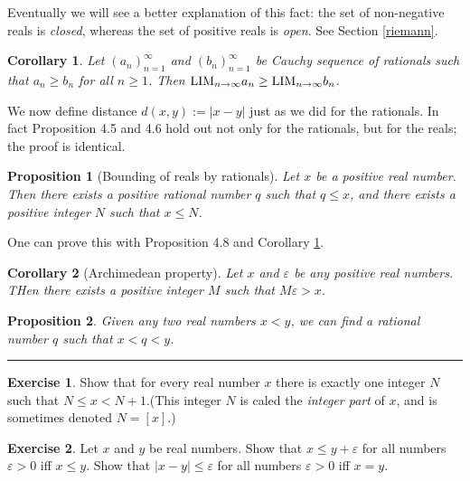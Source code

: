 \documentclass[
]{book}
\newtheorem{corollary}{Corollary}[chapter]
\newtheorem{proposition}{Proposition}[chapter]
\theoremstyle{definition}
\theoremstyle{definition}
\theoremstyle{definition}
\newtheorem{exercise}{Exercise}[chapter]
\theoremstyle{definition}
\theoremstyle{remark}
\begin{document}
Eventually we will see a better explanation of this fact: the set of non-negative reals is \emph{closed}, whereas the set of positive reals is \emph{open}. See Section \ref{riemann}.

\begin{corollary}
\protect\hypertarget{cor:order-preserving}{}\label{cor:order-preserving}Let \((a_n)_{n=1}^{\infty}\) and \((b_n)_{n=1}^{\infty}\) be Cauchy sequence of rationals such that \(a_n\geq b_n\) for all \(n\geq 1\). Then \({\rm LIM}_{n\to \infty}a_n \geq {\rm LIM}_{n\to \infty}b_n\).
\end{corollary}

We now define distance \(d(x,y):=|x-y|\) just as we did for the rationals. In fact Proposition 4.5 and 4.6 hold out not only for the rationals, but for the reals; the proof is identical.

\begin{proposition}[Bounding of reals by rationals]
Let \(x\) be a positive real number. Then there exists a positive rational number \(q\) such that \(q\leq x\), and there exists a positive integer \(N\) such that \(x\leq N\).
\end{proposition}

One can prove this with Proposition 4.8 and Corollary \ref{cor:order-preserving}.

\begin{corollary}[Archimedean property]
\protect\hypertarget{cor:archi}{}\label{cor:archi}Let \(x\) and \(\varepsilon\) be any positive real numbers. THen there exists a positive integer \(M\) such that \(M\varepsilon>x\).
\end{corollary}

\begin{proposition}
Given any two real numbers \(x<y\), we can find a rational number \(q\) such that \(x<q<y\).
\end{proposition}

\begin{center}\rule{0.5\linewidth}{0.5pt}\end{center}

\begin{exercise}
Show that for every real number \(x\) there is exactly one integer \(N\) such that \(N\leq x<N+1\).(This integer \(N\) is caled the \emph{integer part} of \(x\), and is sometimes denoted \(N=[x]\).)
\end{exercise}

\begin{exercise}
Let \(x\) and \(y\) be real numbers. Show that \(x\leq y+\varepsilon\) for all numbers \(\varepsilon>0\) iff \(x\leq y\). Show that \(|x-y|\leq \varepsilon\) for all numbers \(\varepsilon>0\) iff \(x=y\).
\end{exercise}
\end{document}
